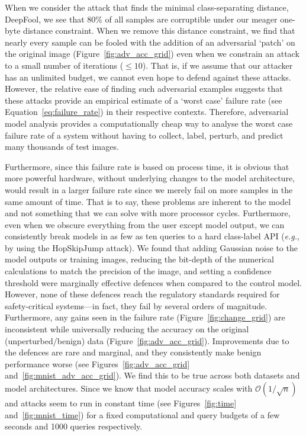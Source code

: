 \documentclass[journal]{IEEEtran}
\begin{document}
When we consider the attack that finds the minimal class-separating distance, DeepFool, we see that 80\% of all samples are corruptible under our meager one-byte distance constraint.
When we remove this distance constraint, we find that nearly every sample can be fooled with the addition of an adversarial `patch' on the original image (Figure~\ref{fig:adv_acc_grid}) even when we constrain an attack to a small number of iterations ($\leq 10$).
That is, if we assume that our attacker has an unlimited budget, we cannot even hope to defend against these attacks.
However, the relative ease of finding such adversarial examples suggests that these attacks provide an empirical estimate of a `worst case' failure rate (see Equation~\ref{eq:failure_rate}) in their respective contexts.
Therefore, adversarial model analysis provides a computationally cheap way to analyse the worst case failure rate of a system without having to collect, label, perturb, and predict many thousands of test images.

Furthermore, since this failure rate is based on process time, it is obvious that more powerful hardware, without underlying changes to the model architecture, would result in a larger failure rate since we merely fail on more samples in the same amount of time.
That is to say, these problems are inherent to the model and not something that we can solve with more processor cycles.
Furthermore, even when we obscure everything from the user except model output, we can consistently break models in as few as ten queries to a hard class-label API (\textit{e.g.}, by using the HopSkipJump attack).
We found that adding Gaussian noise to the model outputs or training images, reducing the bit-depth of the numerical calculations to match the precision of the image, and setting a confidence threshold were marginally effective defences when compared to the control model.
However, none of these defences reach the regulatory standards required for safety-critical systems---in fact, they fail by several orders of magnitude.
Furthermore, any gains seen in the failure rate (Figure~\ref{fig:change_grid}) are inconsistent while universally reducing the accuracy on the original (unperturbed/benign) data (Figure~\ref{fig:adv_acc_grid}).
Improvements due to the defences are rare and marginal, and they consistently make benign performance worse (see Figures~\ref{fig:adv_acc_grid} and~\ref{fig:mnist_adv_acc_grid}).
We find this to be true across both datasets and model architectures.
Since we know that model accuracy scales with $\mathcal{O}(1/\sqrt{n})$~\cite{vapnik1994measuring} and attacks seem to run in constant time (see Figures~\ref{fig:time} and~\ref{fig:mnist_time}) for a fixed computational and query budgets of a few seconds and 1000 queries respectively.
\end{document}
